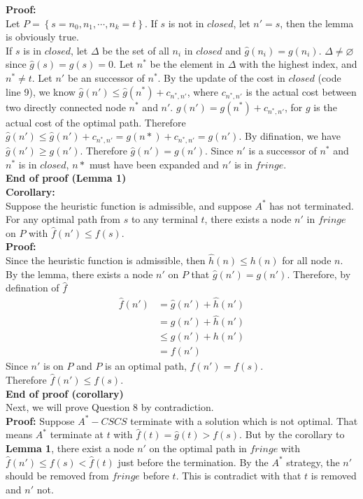 \documentclass[10.5pt]{article}
\begin{document}
\textbf{Proof:}\\
Let $P = \left\{s = n_0, n_1, \cdots, n_k = t\right\}$. If $s$ is not in $closed$, let $n' = s$, then the lemma is obviously true.\\
If $s$ is in $closed$, let $\Delta$ be the set of all $n_i$ in $closed$ and $\hat g(n_i) = g(n_i)$. $\Delta \ne \varnothing$ since $\hat g(s) = g(s) = 0$. Let $n^*$ be the element in $\Delta$ with the highest index, and $n^* \ne t$. Let $n'$ be an successor of $n^*$. By the update of the cost in $closed$ (code line 9), we know $\hat g(n') \le \hat g(n^*) + c_{n^*, n'}$, where $c_{n^*, n'}$ is the actual cost between two directly connected node $n^*$ and $n'$. $g(n') = g(n^*) + c_{n^*, n'}$, for $g$ is the actual cost of the optimal path. Therefore $\hat g(n') \le \hat g(n') + c_{n^*, n'} = g(n*) + c_{n^*, n'} = g(n')$. By difination, we have $\hat g(n') \ge g(n')$. Therefore $\hat g(n') = g(n')$. Since $n'$ is a successor of $n^*$ and $n^*$ is in $closed$, $n*$ must have been expanded and $n'$ is in $fringe$.\\
\textbf{End of proof (Lemma 1)}\\
\textbf{Corollary:}\\
Suppose the heuristic function is admissible, and suppose $A^*$ has not terminated. For any optimal path from $s$ to any terminal $t$, there exists a node $n'$ in $fringe$ on $P$ with $\hat f(n') \le f(s)$.\\
\textbf{Proof:} \\
Since the heuristic function is admissible, then $\hat h(n) \le h(n)$ for all node $n$.
By the lemma, there exists a node $n'$ on $P$ that $\hat g(n') = g(n')$. Therefore, by defination of $\hat f$
\begin{align*}
	\hat f(n') & = \hat g(n') + \hat h(n') \\
	           & = g(n') + \hat h(n')      \\
	           & \le g(n') + h(n')         \\
	           & = f(n')
\end{align*}
Since $n'$ is on $P$ and $P$ is an optimal path, $f(n') = f(s)$.\\
Therefore $\hat f(n')\le f(s)$.\\
\textbf{End of proof (corollary)}\\
Next, we will prove Question 8 by contradiction.\\
\textbf{Proof:}
Suppose $A^*-CSCS$ terminate with a solution which is not optimal. That means $A^*$ terminate at $t$ with $\hat f(t) = \hat g(t) > f(s)$. But by the corollary to \textbf{Lemma 1}, there exist a node $n'$ on the optimal path in $fringe$ with $\hat f(n') \le f(s) < \hat f(t)$ just before the termination. By the $A^*$ strategy, the $n'$ should be removed from $fringe$ before $t$. This is contradict with that $t$ is removed and $n'$ not.\\
\end{document}
